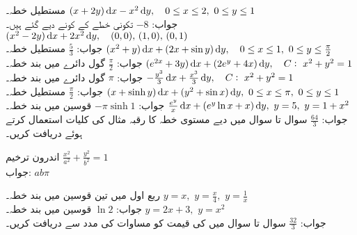 \quad مستطیل خطہ۔
$(x+2y)\dif x-x^2\dif y,\quad 0\le x\le 2,\,\,0\le y \le 1$\\
جواب:\quad
$-8$
\quad تکونی خطے کے کونے دیے گئے ہیں۔
$(x^2-2y)\dif x+2x^2\dif y,\quad (0,0),\, (1,0),\,(0,1)$\\
جواب:\quad
$\tfrac{5}{3}$
\quad مستطیل خطہ۔
$(x^2+y)\dif x+(2x+\sin y)\dif y,\quad 0\le x \le 1,\,\,0\le y\le \tfrac{\pi}{2}$\\
جواب:\quad
$\tfrac{\pi}{2}$
\quad گول دائرے میں بند خطہ۔
$(e^{2x}+3y)\dif x+(2e^y+4x)\dif y,\quad C: \,\, x^2+y^2=1$\\
جواب:\quad
$\pi$
\quad گول دائرے میں بند خطہ۔
$-\tfrac{y^3}{3}\dif x+\tfrac{x^3}{3}\dif y,\quad C: \,\, x^2+y^2=1$\\
جواب:\quad
$\tfrac{\pi}{2}$
\quad مستطیل خطہ۔
$(x+\sinh y)\dif x+(y^2+\sin x)\dif y,\,\,  0\le x \le \pi,\,\, 0\le y \le 1$\\
جواب:\quad
$-\pi \sinh 1$
\quad قوسین میں بند خطہ۔
$\tfrac{e^y}{x}\dif x+(e^y\ln x+x)\dif y,\,\, y=5,\,\, y=1+x^2$\\
جواب:\quad
$\tfrac{64}{3}$
سوال  تا سوال  میں دیے مستوی خطہ کا رقبہ مثال  کی  کلیات استعمال کرتے ہوئے  دریافت کریں۔

\quad اندرون ترخیم\quad 
$\tfrac{x^2}{a^2}+\tfrac{y^2}{b^2}=1$\\
جواب:\quad
$ab\pi$

\quad ربع اول میں تین قوسین میں بند خطہ۔\quad 
$y=x,\,\, y=\tfrac{x}{4},\,\,y=\tfrac{1}{x}$\\
جواب:\quad
$\ln 2$
\quad قوسین میں بند خطہ۔\quad 
$y=2x+3,\,\,y=x^2$\\
جواب:\quad
$\tfrac{32}{3}$
سوال  تا سوال  میں  کی قیمت کو مساوات  کی مدد سے دریافت کریں۔

